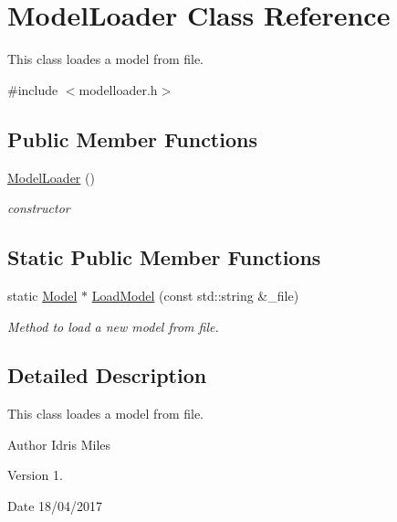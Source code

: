 \hypertarget{classModelLoader}{}\section{Model\+Loader Class Reference}
\label{classModelLoader}


This class loades a model from file.  




{\ttfamily \#include $<$modelloader.\+h$>$}

\subsection*{Public Member Functions}
\begin{DoxyCompactItemize}
\item 
\hyperlink{classModelLoader_a5892e5788d106f1e57124a73cdb2ddb5}{Model\+Loader} ()\hypertarget{classModelLoader_a5892e5788d106f1e57124a73cdb2ddb5}{}\label{classModelLoader_a5892e5788d106f1e57124a73cdb2ddb5}

\begin{DoxyCompactList}\small\item\em constructor \end{DoxyCompactList}\end{DoxyCompactItemize}
\subsection*{Static Public Member Functions}
\begin{DoxyCompactItemize}
\item 
static \hyperlink{classModel}{Model} $\ast$ \hyperlink{classModelLoader_ab89c5571cb8711db7d0c4aff88884544}{Load\+Model} (const std\+::string \&\+\_\+file)
\begin{DoxyCompactList}\small\item\em Method to load a new model from file. \end{DoxyCompactList}\end{DoxyCompactItemize}


\subsection{Detailed Description}
This class loades a model from file. 

\begin{DoxyAuthor}{Author}
Idris Miles 
\end{DoxyAuthor}
\begin{DoxyVersion}{Version}
1. 
\end{DoxyVersion}
\begin{DoxyDate}{Date}
18/04/2017 
\end{DoxyDate}


